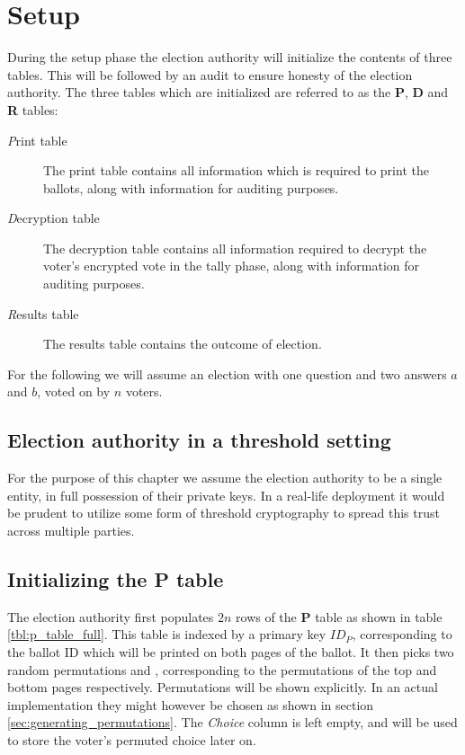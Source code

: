 \chapter{Setup}
\label{ch:setup}

During the setup phase the election authority will initialize the contents of
three tables. This will be followed by an audit to ensure honesty of the
election authority. The three tables which are initialized are referred to as
the \textbf{P}, \textbf{D} and \textbf{R} tables:
\begin{description}
\item[\emph{P}rint table] The print table contains all information which is
	required to print the ballots, along with information for auditing
		purposes.
\item[\emph{D}ecryption table] The decryption table contains all information
	required to decrypt the voter's encrypted vote in the tally phase,
		along with information for auditing purposes.
\item[\emph{R}esults table] The results table contains the outcome of election.
\end{description}

For the following we will assume an election with one question and two answers
$a$ and $b$, voted on by $n$ voters.

\section{Election authority in a threshold setting}

For the purpose of this chapter we assume the election authority to be a single
entity, in full possession of their private keys. In a real-life deployment it
would be prudent to utilize some form of threshold cryptography to spread this
trust across multiple parties.

\section{Initializing the \textbf{P} table}

The election authority first populates $2n$ rows of the \textbf{P} table as shown
in table \ref{tbl:p_table_full}. This table is indexed by a primary key $ID_P$,
corresponding to the ballot ID which will be printed on both pages of the
ballot. It then picks two random permutations \ptop{} and \pbottom{},
corresponding to the permutations of the top and bottom pages respectively.
Permutations will be shown explicitly. In an actual implementation they might
however be chosen as shown in section \ref{sec:generating_permutations}. The
\emph{Choice} column is left empty, and will be used to store the voter's
permuted choice later on.

